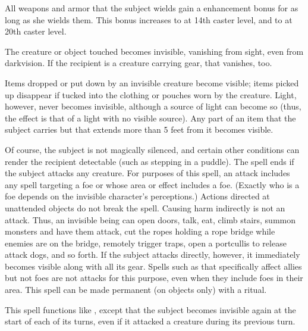 \spelldur{\durshort}
\spelleffect All weapons and armor that the subject wields gain a  enhancement bonus for as long as she wields them. This bonus increases to  at 14th caster level, and to  at 20th caster level.

\spelldur{\durshort \dismissable}
\spellsuccess The creature or object touched becomes invisible, vanishing from sight, even from darkvision. If the recipient is a creature carrying gear, that vanishes, too.
\par Items dropped or put down by an invisible creature become visible; items picked up disappear if tucked into the clothing or pouches worn by the creature. Light, however, never becomes invisible, although a source of light can become so (thus, the effect is that of a light with no visible source). Any part of an item that the subject carries but that extends more than 5 feet from it becomes visible.
\par Of course, the subject is not magically silenced, and certain other conditions can render the recipient detectable (such as stepping in a puddle). The spell ends if the subject attacks any creature. For purposes of this spell, an attack includes any spell targeting a foe or whose area or effect includes a foe. (Exactly who is a foe depends on the invisible character's perceptions.) Actions directed at unattended objects do not break the spell. Causing harm indirectly is not an attack. Thus, an invisible being can open doors, talk, eat, climb stairs, summon monsters and have them attack, cut the ropes holding a rope bridge while enemies are on the bridge, remotely trigger traps, open a portcullis to release attack dogs, and so forth. If the subject attacks directly, however, it immediately becomes visible along with all its gear. Spells such as  that specifically affect allies but not foes are not attacks for this purpose, even when they include foes in their area.
\spellnotes This spell can be made permanent (on objects only) with a  ritual.

\spelleffect This spell functions like , except that the subject becomes invisible again at the start of each of its turns, even if it attacked a creature during its previous turn.

